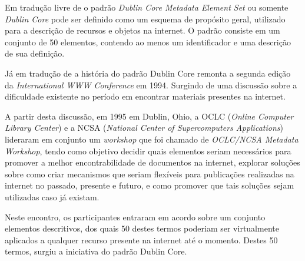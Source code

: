 Em tradução livre de \cite{2003:Caplan}
o padrão \emph{Dublin Core Metadata Element Set} ou somente \emph{Dublin Core}
pode ser definido como um esquema de propósito geral, utilizado para a descrição
de recursos e objetos na internet. O padrão consiste em um conjunto de 50
elementos, contendo ao menos um identificador e uma descrição de sua definição.

Já em tradução de \cite{2018:Banerjee} a história do padrão Dublin Core
remonta a segunda edição da \emph{International WWW Conference} em 1994.
Surgindo de uma discussão sobre a dificuldade existente no período em
encontrar materiais presentes na internet.

A partir desta discussão,
em 1995 em Dublin, Ohio, a OCLC (\emph{Online Computer Library Center}) e a
NCSA (\emph{National Center of Supercomputers Applications}) lideraram
em conjunto um \emph{workshop} que foi chamado de \emph{OCLC/NCSA Metadata Workshop},
tendo como objetivo decidir quais elementos seriam necessários para
promover a melhor encontrabilidade de documentos na internet, explorar
soluções sobre como criar mecanismos que seriam flexíveis para publicações
realizadas na internet no passado, presente e futuro, e como promover
que tais soluções sejam utilizadas caso já existam.

Neste encontro, os participantes entraram em acordo sobre um conjunto
elementos descritivos, dos quais 50 destes termos poderiam ser
virtualmente aplicados a qualquer recurso presente na internet até
o momento. Destes 50 termos, surgiu a iniciativa do padrão Dublin Core.

